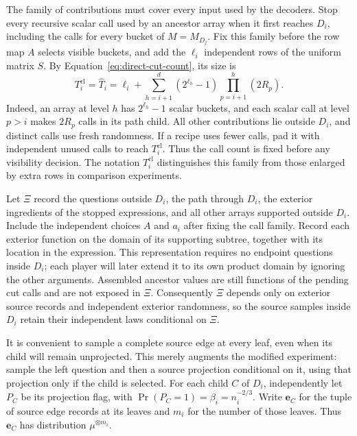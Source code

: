 The family of contributions must cover every input used by the decoders.
Stop every recursive scalar call used by an ancestor array when it first
reaches $D_i$, including the calls for every bucket of $M=M_{D_j}$.
Fix this family before the row map $A$ selects visible buckets, and add
the $\ell_i$ independent rows of the uniform matrix $S$.
By Equation~\eqref{eq:direct-cut-count}, its size is
\begin{equation}
 T_i^{\mathrm{cl}}=\widehat T_i=\ell_i+
 \sum_{h=i+1}^{d}(2^{\ell_h}-1)
                   \prod_{p=i+1}^{h}(2R_p).
 \label{eq:clean-call-count}
\end{equation}
Indeed, an array at level $h$ has $2^{\ell_h}-1$ scalar buckets, and
each scalar call at level $p>i$ makes $2R_p$ calls in its path child.
All other contributions lie outside $D_i$, and distinct calls use fresh
randomness.  If a recipe uses fewer calls, pad it with independent unused
calls to reach $T_i^{\mathrm{cl}}$.  Thus the call count is fixed before any
visibility decision.  The notation $T_i^{\mathrm{cl}}$ distinguishes this
family from those enlarged by extra rows in comparison experiments.

Let $\Xi$ record the questions outside $D_i$, the path through $D_i$,
the exterior ingredients of the stopped expressions, and all other arrays
supported outside $D_i$.  Include the independent choices $A$ and $a_i$
after fixing the call family.  Record each exterior function on the domain
of its supporting subtree, together with its location in the expression.
This representation requires no endpoint questions inside $D_i$; each
player will later extend it to its own product domain by ignoring the
other arguments.  Assembled ancestor values are still functions of the
pending cut calls and are not exposed in $\Xi$.
Consequently $\Xi$ depends only on exterior source records and independent
exterior randomness, so the source samples inside $D_i$ retain their
independent laws conditional on $\Xi$.

It is convenient to sample a complete source edge at every leaf,
even when its child will remain unprojected.  This merely augments
the modified experiment: sample the left question and then a source
projection conditional on it, using that projection only if the
child is selected.  For each child $C$ of $D_i$, independently let
$P_C$ be its projection flag, with
$\Pr(P_C=1)=\beta_i=n_i^{-2/3}$.  Write $\boldsymbol e_C$ for the
tuple of source edge records at its leaves and $m_i$ for the number
of those leaves.  Thus $\boldsymbol e_C$ has distribution
$\mu^{\otimes m_i}$.


